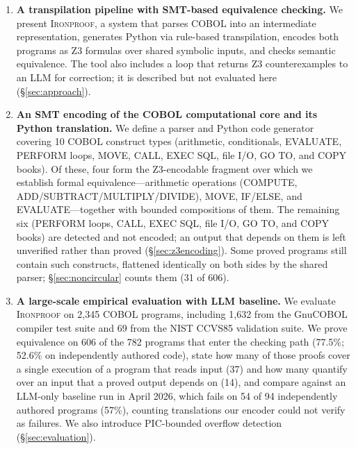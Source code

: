 \documentclass[sigconf,nonacm]{acmart}
\begin{document}
\begin{enumerate}
  \item \textbf{A transpilation pipeline with SMT-based equivalence checking.} We present \textsc{Ironproof}, a system that parses COBOL into an intermediate representation, generates Python via rule-based transpilation, encodes both programs as Z3 formulas over shared symbolic inputs, and checks semantic equivalence. The tool also includes a loop that returns Z3 counterexamples to an LLM for correction; it is described but not evaluated here (\S\ref{sec:approach}).

  \item \textbf{An SMT encoding of the COBOL computational core and its Python translation.} We define a parser and Python code generator covering 10 COBOL construct types (arithmetic, conditionals, EVALUATE, PERFORM loops, MOVE, CALL, EXEC SQL, file I/O, GO TO, and COPY books). Of these, four form the Z3-encodable fragment over which we establish formal equivalence---arithmetic operations (COMPUTE, ADD/SUBTRACT/MULTIPLY/DIVIDE), MOVE, IF/ELSE, and EVALUATE---together with bounded compositions of them. The remaining six (PERFORM loops, CALL, EXEC SQL, file I/O, GO TO, and COPY books) are detected and not encoded; an output that depends on them is left unverified rather than proved (\S\ref{sec:z3encoding}). Some proved programs still contain such constructs, flattened identically on both sides by the shared parser; \S\ref{sec:noncircular} counts them (31 of 606).

  \item \textbf{A large-scale empirical evaluation with LLM baseline.} We evaluate \textsc{Ironproof} on 2{,}345 COBOL programs, including 1{,}632 from the GnuCOBOL compiler test suite and 69 from the NIST CCVS85 validation suite. We prove equivalence on 606 of the 782 programs that enter the checking path (77.5\%; 52.6\% on independently authored code), state how many of those proofs cover a single execution of a program that reads input (37) and how many quantify over an input that a proved output depends on (14), and compare against an LLM-only baseline run in April 2026, which fails on 54 of 94 independently authored programs (57\%), counting translations our encoder could not verify as failures. We also introduce PIC-bounded overflow detection (\S\ref{sec:evaluation}).
\end{enumerate}

\end{document}
